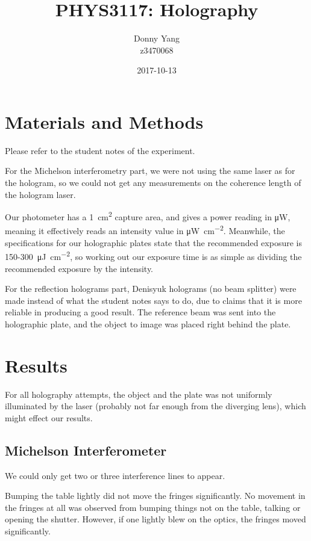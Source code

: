 \documentclass[a4paper]{scrartcl}
\begin{document}
\title{PHYS3117: Holography}
\author{Donny Yang \\ z3470068}
\date{2017-10-13}
\maketitle

\section{Materials and Methods}
Please refer to the student notes of the experiment.

For the Michelson interferometry part, we were not using the same laser as for the hologram, so we could not get any measurements on the coherence length of the hologram laser.

Our photometer has a \SI{1}{\centi\metre\squared} capture area, and gives a power reading in \si{\micro\watt}, meaning it effectively reads an intensity value in \si{\micro\watt\per\centi\metre\squared}. Meanwhile, the specifications for our holographic plates state that the recommended exposure is 150-\SI{300}{\micro\joule\per\centi\metre\squared}, so working out our exposure time is as simple as dividing the recommended exposure by the intensity.

For the reflection holograms part, Denisyuk holograms (no beam splitter) were made instead of what the student notes says to do, due to claims that it is more reliable in producing a good result. The reference beam was sent into the holographic plate, and the object to image was placed right behind the plate.

\section{Results}
For all holography attempts, the object and the plate was not uniformly illuminated by the laser (probably not far enough from the diverging lens), which might effect our results.

\subsection{Michelson Interferometer}
We could only get two or three interference lines to appear.

Bumping the table lightly did not move the fringes significantly. No movement in the fringes at all was observed from bumping things not on the table, talking or opening the shutter. However, if one lightly blew on the optics, the fringes moved significantly.
\end{document}
